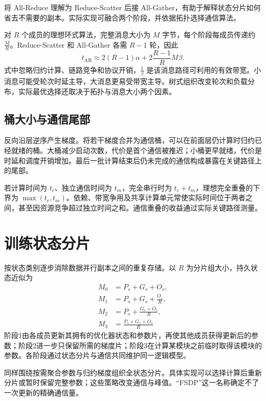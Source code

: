 \documentclass[../textbook.tex]{subfiles}
\begin{document}
将 All-Reduce 理解为 Reduce-Scatter 后接 All-Gather，有助于解释状态分片如何省去不需要的副本。实际实现可融合两个阶段，并依据拓扑选择通信算法。

对 $R$ 个成员的理想环式算法，完整消息大小为 $M$ 字节，每个阶段每成员传递约 $\frac{M}{R}$。Reduce-Scatter 和 All-Gather 各需 $R-1$ 轮，因此
\begin{equation}
 t_{\mathrm{AR}}\approx2(R-1)\alpha+
 2\frac{R-1}{R}M\beta.
 \label{eq:dist-ring}
\end{equation}
式中忽略归约计算、链路竞争和协议开销，$\frac{1}{\beta}$ 是该消息路径可利用的有效带宽。小消息可能受轮次时延主导，大消息更易受带宽主导。树式组织改变轮次和负载分布，实际最优选择还取决于拓扑与消息大小两个因素。

\subsection{桶大小与通信尾部}
反向沿层逆序产生梯度。将若干梯度合并为通信桶，可以在前面层仍计算时归约已经就绪的桶。大桶减少启动次数，代价是首个通信被推迟；小桶更早就绪，代价是时延和调度开销增加。最后一批计算结束后仍未完成的通信构成暴露在关键路径上的尾部。

若计算时间为 $t_c$、独立通信时间为 $t_m$，完全串行时为 $t_c+t_m$，理想完全重叠的下界为 $\max(t_c,t_m)$。依赖、带宽争用及共享计算单元常使实际时间位于两者之间，甚至因资源竞争超过独立时间之和。通信重叠的收益通过实际关键路径测量。

\section{训练状态分片}

按状态类别逐步消除数据并行副本之间的重复存储\autocite{rajbhandari2020zero}。以 $R$ 为分片组大小，持久状态近似为
\begin{align}
 M_0&=P_s+G_s+O_s,\\
 M_1&=P_s+G_s+\frac{O_s}{R},\\
 M_2&=P_s+\frac{G_s+O_s}{R},\\
 M_3&=\frac{P_s+G_s+O_s}{R}
 \label{eq:dist-zero-memory}
\end{align}
阶段1由各成员更新其拥有的优化器状态和参数片，再使其他成员获得更新后的参数；阶段2进一步只保留所需的梯度片；阶段3在计算某模块之前临时取得该模块的参数。各阶段通过状态分片与通信共同维护同一逻辑模型。

同样围绕按需聚合参数与归约梯度组织全状态分片\autocite{zhao2023fsdp}。具体实现可以选择计算后重新分片或暂时保留完整参数；这些策略改变通信与峰值。“FSDP”这一名称确定不了一次更新的精确通信量。
\end{document}
